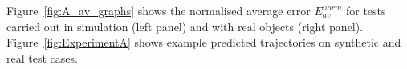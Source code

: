 Figure~\ref{fig:A_av_graphs} %
shows the normalised average error $E_{av}^{norm}$ for tests carried
out in simulation (left panel) and with real objects (right panel).
Figure~\ref{fig:ExperimentA} shows example predicted trajectories on
synthetic and real test cases.




